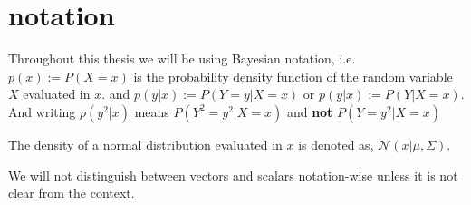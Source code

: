 




\section{notation}
Throughout this thesis we will be using Bayesian notation, i.e. $p(x) := P(X=x)$ is the probability
density function of the random variable $X$ evaluated in $x$. and $p(y|x) := P(Y=y|X=x)$ or $p(y|x)
:= P(Y|X=x)$. And writing $p(y^2|x)$ means $P(Y^2=y^2|X=x)$ and \textbf{not} $P(Y=y^2|X=x)$

The density of a normal distribution evaluated in $x$ is denoted as, $\mathcal{N}(x|\mu, \Sigma)$. 

We will not distinguish between vectors and scalars notation-wise unless it is not clear from the 
context. 


